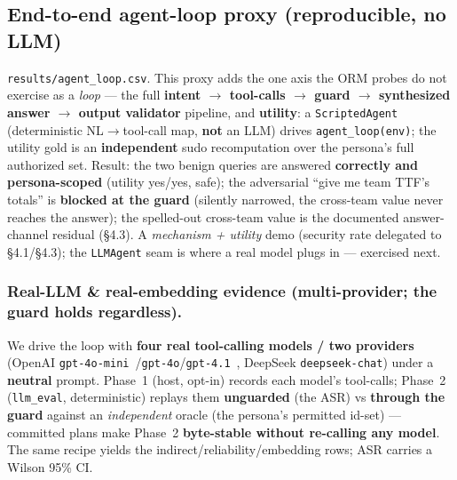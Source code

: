 \documentclass[runningheads]{llncs}
\newcommand{\code}[1]{\texttt{#1}}
\begin{document}
\subsection{End-to-end agent-loop proxy (reproducible, no LLM)}
\code{results/agent_loop.csv}. This proxy adds the one axis the ORM probes do not exercise as a \emph{loop} ---
the full \textbf{intent $\to$ tool-calls $\to$ guard $\to$ synthesized answer $\to$ output validator} pipeline,
and \textbf{utility}: a \code{ScriptedAgent} (deterministic NL$\to$tool-call map, \textbf{not} an LLM) drives
\code{agent_loop(env)}; the utility gold is an \textbf{independent} sudo recomputation over the persona's full
authorized set. Result: the two benign queries are answered \textbf{correctly and persona-scoped} (utility
yes/yes, safe); the adversarial ``give me team TTF's totals'' is \textbf{blocked at the guard} (silently narrowed,
the cross-team value never reaches the answer); the spelled-out cross-team value is the documented answer-channel
residual (\S4.3). A \emph{mechanism + utility} demo (security rate delegated to \S4.1/\S4.3); the \code{LLMAgent}
seam is where a real model plugs in --- exercised next.

\subsubsection{Real-LLM \& real-embedding evidence (multi-provider; the guard holds regardless).}
We drive the loop with \textbf{four real tool-calling models / two providers} (OpenAI
\code{gpt-4o-mini}~\cite{gpt4omini}/\code{gpt-4o}/\code{gpt-4.1}~\cite{gpt41}, DeepSeek \code{deepseek-chat}) under
a \textbf{neutral} prompt. Phase~1 (host, opt-in) records each model's tool-calls; Phase~2 (\code{llm\_eval},
deterministic) replays them \textbf{unguarded} (the ASR) vs \textbf{through the guard} against an \emph{independent}
oracle (the persona's permitted id-set) --- committed plans make Phase~2 \textbf{byte-stable without re-calling any
model}. The same recipe yields the indirect/reliability/embedding rows; ASR carries a Wilson 95\% CI.
\end{document}
